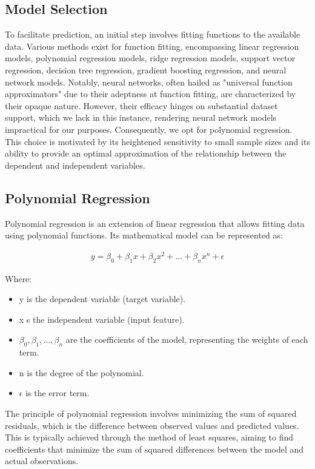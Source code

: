 \documentclass{swmcmthesis}
\begin{document}
\subsection{Model Selection}

To facilitate prediction, an initial step involves fitting functions to the available data. Various methods exist for function fitting, encompassing linear regression models, polynomial regression models, ridge regression models, support vector regression, decision tree regression, gradient boosting regression, and neural network models. Notably, neural networks, often hailed as "universal function approximators" due to their adeptness at function fitting, are characterized by their opaque nature. However, their efficacy hinges on substantial dataset support, which we lack in this instance, rendering neural network models impractical for our purposes. Consequently, we opt for polynomial regression. This choice is motivated by its heightened sensitivity to small sample sizes and its ability to provide an optimal approximation of the relationship between the dependent and independent variables.

\subsection{Polynomial Regression}


Polynomial regression is an extension of linear regression that allows fitting data using polynomial functions. Its mathematical model can be represented as:

\begin{align}
\label{eq}
    y = \beta_0 + \beta_1 x + \beta_2 x^2 + ... + \beta_n x^n + \epsilon \nonumber
\end{align}

Where:

\begin{itemize}
    \item y is the dependent variable (target variable).
    \item x s the independent variable (input feature).
    \item $\beta_0, \beta_1, ..., \beta_n$ are the coefficients of the model, representing the weights of each term.
    \item n is the degree of the polynomial.
    \item $\epsilon$  is the error term.
\end{itemize}

The principle of polynomial regression involves minimizing the sum of squared residuals, which is the difference between observed values and predicted values. This is typically achieved through the method of least squares, aiming to find coefficients that minimize the sum of squared differences between the model and actual observations.
\end{document}
